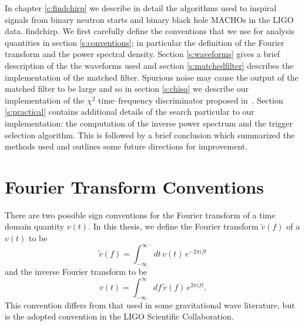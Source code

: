 
In chapter \ref{c:findchirp} we describe in detail the algorithms used to
inspiral signals from binary neutron starts and binary black hole MACHOs in
the LIGO data.  findchirp. We first carefully define the conventions that we
use for analysis quantities in section \ref{s:conventions}; in particular the
definition of the Fourier transform and the power spectral density. Section
\ref{s:waveforms} gives a brief description of the the waveforms used and
section \ref{s:matchedfilter} describes the implementation of the matched
filter.  Spurious noise may cause the output of the matched filter to be large
and so in section \ref{s:chisq} we describe our implementation of the $\chi^2$
time--frequency discriminator proposed in~\cite{allen}. Section
\ref{s:practical} contains additional details of the search particular to our
implementation: the computation of the inverse power spectrum and the trigger
selection algorithm. This is followed by a brief conclusion which summarized
the methods used and outlines some future directions for improvement.

\section{Fourier Transform Conventions}
\label{s:ftconv}

There are two possible sign conventions for the Fourier transform of a time
domain quantity $v(t)$. In this thesis, we define the Fourier transform
$\tilde{v}(f)$ of a $v(t)$ to be
\begin{equation}
\label{eq:ft}
\tilde{v}(f)=\int_{-\infty}^\infty dt\,v(t)\, e^{- 2 \pi i f t}
\end{equation}
and the inverse Fourier transform to be 
\begin{equation}
\label{eq:ift}
v(t)=\int_{-\infty}^\infty df\,\tilde{v}(f)\, e^{2 \pi i f t}.
\end{equation}
This convention differs from that used in some gravitational wave literature,
but is the adopted convention in the LIGO Scientific Collaboration.
